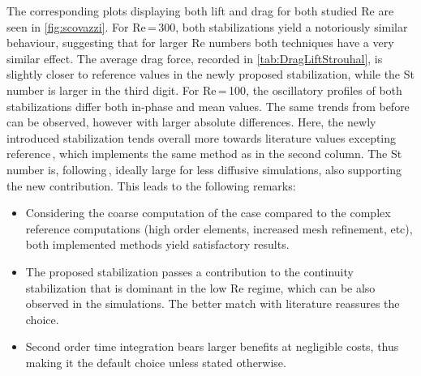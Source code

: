 The corresponding plots displaying both lift and drag for both studied Re are seen in \autoref{fig:scovazzi}. For Re\,=\,300, both stabilizations yield a notoriously similar behaviour, suggesting that for larger Re numbers both techniques have a very similar effect. The average drag force, recorded in \autoref{tab:DragLiftStrouhal}, is slightly closer to reference values in the newly proposed stabilization, while the St number is larger in the third digit. For Re\,=\,100, the oscillatory profiles of both stabilizations differ both in-phase and mean values. The same trends from before can be observed, however with larger absolute differences. Here, the newly introduced stabilization tends overall more towards literature values excepting reference\,\cite{Tezduyar2000}, which implements the same method as in the second column. The St number is, following\,\cite{Tezduyar2000}, ideally large for less diffusive simulations, also supporting the new contribution. This leads to the following remarks:


\begin{tcolorbox}[conclusions]

	\begin{itemize}
		\item Considering the coarse computation of the case compared to the complex reference computations (high order elements, increased mesh refinement, etc), both implemented methods yield satisfactory results.
		\item The proposed stabilization passes a contribution to the continuity stabilization that is dominant in the low Re regime, which can be also observed in the simulations. The better match with literature reassures the choice.
		\item Second order time integration bears larger benefits at negligible costs, thus making it the default choice unless stated otherwise.
	\end{itemize}
\end{tcolorbox}

